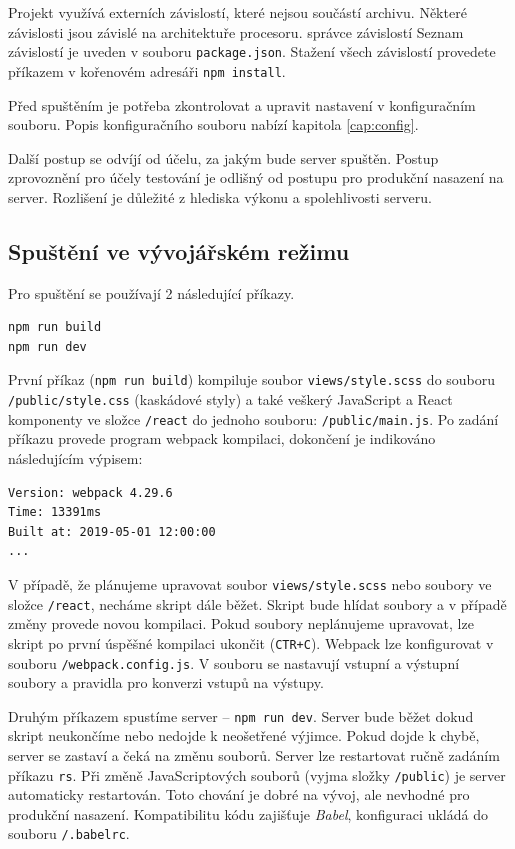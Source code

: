 Projekt využívá externích závislostí, které nejsou součástí archivu. Některé závislosti jsou závislé na architektuře procesoru. správce závislostí  Seznam závislostí je uveden v souboru \texttt{package.json}. Stažení všech závislostí provedete příkazem v kořenovém adresáři \texttt{npm install}.

Před spuštěním je potřeba zkontrolovat a upravit nastavení v konfiguračním souboru. Popis konfiguračního souboru nabízí kapitola \ref{cap:config}.

Další postup se odvíjí od účelu, za jakým bude server spuštěn. Postup zprovoznění pro účely testování je odlišný od postupu pro produkční nasazení na server. Rozlišení je důležité z hlediska výkonu a spolehlivosti serveru.

\subsection{Spuštění ve vývojářském režimu}
Pro spuštění se používají 2 následující příkazy.
\begin{lstlisting}[style=bash]
npm run build
npm run dev
\end{lstlisting}
První příkaz (\texttt{npm run build}) kompiluje soubor \texttt{views/style.scss} do souboru \texttt{/public/style.css} (kaskádové styly) a také veškerý JavaScript a React komponenty ve složce \texttt{/react} do jednoho souboru: \texttt{/public/main.js}. Po zadání příkazu provede program webpack kompilaci, dokončení je indikováno následujícím výpisem:
\begin{lstlisting}
Version: webpack 4.29.6
Time: 13391ms
Built at: 2019-05-01 12:00:00
...
\end{lstlisting}

V případě, že plánujeme upravovat soubor \texttt{views/style.scss} nebo soubory ve složce \texttt{/react}, necháme skript dále běžet. Skript bude hlídat soubory a v případě změny provede novou kompilaci. Pokud soubory neplánujeme upravovat, lze skript po první úspěšné kompilaci ukončit (\texttt{CTR+C}). Webpack lze konfigurovat v souboru \texttt{/webpack.config.js}. V souboru se nastavují vstupní a výstupní soubory a pravidla pro konverzi vstupů na výstupy.

Druhým příkazem spustíme server -- \texttt{npm run dev}. Server bude běžet dokud skript neukončíme nebo nedojde k neošetřené výjimce. Pokud dojde k chybě, server se zastaví a čeká na změnu souborů. Server lze restartovat ručně zadáním příkazu \texttt{rs}. Při změně JavaScriptových souborů (vyjma složky \texttt{/public}) je server automaticky restartován. Toto chování je dobré na vývoj, ale nevhodné pro produkční nasazení. Kompatibilitu kódu zajišťuje \textit{Babel}, konfiguraci ukládá do souboru \texttt{/.babelrc}.


